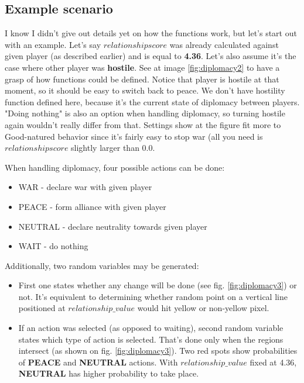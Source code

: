 \subsection{Example scenario}
\begin{par}
	I know I didn't give out details yet on how the functions work, but let's start out with an example. Let's say $relationship score$ was already calculated against given player (as described earlier) and is equal to \textbf{4.36}.
	Let's also assume it's the case where other player was \textbf{hostile}. See at image \ref{fig:diplomacy2} to have a grasp of how functions could be defined. 
	Notice that player is hostile at that moment, so it should be easy to switch back to peace. 
	We don't have hostility function defined here, because it's the current state of diplomacy between players. 
	"Doing nothing" is also an option when handling diplomacy, so turning hostile again wouldn't really differ from that. 
	Settings show at the figure fit more to Good-natured behavior since it's fairly easy to stop war (all you need is $relationship score$ slightly larger than 0.0.
\end{par}
\begin{par}
	When handling diplomacy, four possible actions can be done:
	\begin{itemize}
		\item WAR - declare war with given player
		\item PEACE - form alliance with given player
		\item NEUTRAL - declare neutrality towards given player
		\item WAIT - do nothing
	\end{itemize}
	Additionally, two random variables may be generated:
	\begin{itemize}
		\item First one states whether any change will be done (see fig. \ref{fig:diplomacy3}) or not. It's equivalent to determining whether random point on a vertical line positioned at $relationship\_value$ would hit yellow or non-yellow pixel. 
		\item If an action was selected (as opposed to waiting), second random variable states which type of action is selected. That's done only when the regions intersect (as shown on fig. \ref{fig:diplomacy3}). Two red spots show probabilities of \textbf{PEACE} and \textbf{NEUTRAL} actions. With $relationship\_value$ fixed at 4.36, \textbf{NEUTRAL} has higher probability to take place.
	\end{itemize}
\end{par}

